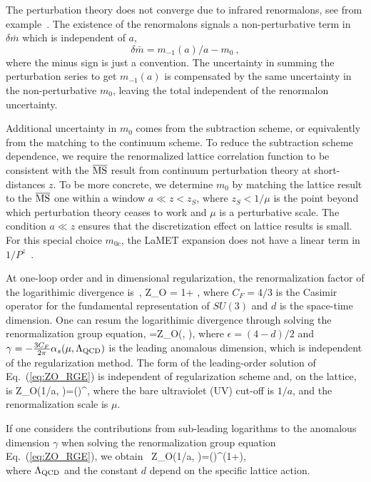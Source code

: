 The perturbation theory does not converge due to infrared renormalons, see from example~\cite{Ji:1995tm,Beneke:1998ui,Bauer:2011ws,Bali:2013pla}. The existence of the renormalons signals a non-perturbative term in $\delta \bar m$ which is independent of $a$, 
\begin{equation}\label{eq:m0}
      \delta\bar m = m_{-1}(a)/a - m_0 \ , 
\end{equation}
where the minus sign is just a convention.
The uncertainty in summing the perturbation series to get $m_{-1}(a)$
is compensated by the same uncertainty in the non-perturbative $m_0$, leaving the total independent of the renormalon uncertainty. 

Additional uncertainty in $m_0$ comes from the subtraction scheme, or equivalently from the matching to the continuum scheme.  
To reduce the subtraction scheme dependence, we require the renormalized lattice correlation function to be consistent with the $\overline{\rm MS}$ result from continuum perturbation theory at short-distances $z$. To be more concrete, we determine $m_0$ by matching the lattice result to the $\overline{\rm MS}$ one 
within a window $a \ll z < z_S$, where $z_S < 1/\mu$ is the point beyond which perturbation theory ceases to work and $\mu$ is a perturbative scale. The condition $a \ll z$ ensures that the discretization effect on lattice results is small. For this special choice $m_{0c}$, the LaMET expansion does not have a linear term in $1/P^z$~\cite{Ji:2020brr}.

At one-loop order and in dimensional regularization, the renormalization factor of the logarithimic divergence is~\cite{Ji:2020ect,Constantinou:2017sej},
\bea\label{eq:ZO}
Z_{O} = 1+ ,
\eea
where $C_{F}=4/3$ is the Casimir operator for the fundamental representation of $SU(3)$ and $d$ is the space-time dimension.
One can resum the logarithimic divergence through solving the renormalization group equation,
\bea\label{eq:ZO_RGE}
=\gamma Z_{O}(\epsilon, \mu),
\eea
where $\epsilon=(4-d)/2$ and $\gamma=-\frac{3 C_{F}}{2 \pi} \alpha_{s}(\mu, \Lambda_{\rm QCD})$ 
is the leading anomalous dimension, which is independent of the regularization method. 
The form of the leading-order solution of Eq.~(\ref{eq:ZO_RGE}) is independent of regularization scheme and, on the lattice, is
\bea\label{eq:ZO_RS}
Z_{O}(1/a, \mu)=\left(\right)^{},
\eea
where the bare ultraviolet (UV) cut-off is $1/a$, and the renormalization scale is $\mu$. 

If one considers the contributions from sub-leading logarithms to the anomalous dimension $\gamma$ when solving the renormalization group equation Eq.~(\ref{eq:ZO_RGE}), we obtain~\cite{Ji:1991pr}
\bea\label{eq:ZO_RS_higher}
Z_{O}(1/a, \mu)=\left(\right)^{}\left(1+\right),\nonumber\\
\eea
where $\Lambda_{\rm QCD}$ and the constant $d$ depend on the specific lattice action.
